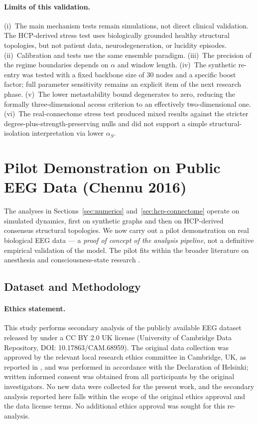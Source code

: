 \documentclass[11pt,a4paper]{article}
\theoremstyle{plain}
\theoremstyle{definition}
\theoremstyle{remark}
\begin{document}
\paragraph{Limits of this validation.} (i)~The main mechanism tests remain simulations, not direct clinical validation. The HCP-derived stress test uses biologically grounded healthy structural topologies, but not patient data, neurodegeneration, or lucidity episodes. (ii)~Calibration and tests use the same ensemble paradigm. (iii)~The precision of the regime boundaries depends on $\alpha$ and window length. (iv)~The synthetic re-entry was tested with a fixed backbone size of 30 nodes and a specific boost factor; full parameter sensitivity remains an explicit item of the next research phase. (v)~The lower metastability bound degenerates to zero, reducing the formally three-dimensional access criterion to an effectively two-dimensional one. (vi)~The real-connectome stress test produced mixed results against the stricter degree-plus-strength-preserving nulls and did not support a simple structural-isolation interpretation via lower $\alpha_S$.


\section{Pilot Demonstration on Public EEG Data (Chennu 2016)}
\label{sec:pilot}

The analyses in Sections~\ref{sec:numerics} and~\ref{sec:hcp-connectome} operate on simulated dynamics, first on synthetic graphs and then on HCP-derived consensus structural topologies. We now carry out a pilot demonstration on real biological EEG data --- a \emph{proof of concept of the analysis pipeline}, not a definitive empirical validation of the model. The pilot fits within the broader literature on anesthesia and consciousness-state research \citep{alkire2008,sarasso2015,bola2017}.

\subsection{Dataset and Methodology}

\paragraph{Ethics statement.} This study performs secondary analysis of the publicly available EEG dataset released by \citet{chennu2016} under a CC BY 2.0 UK license (University of Cambridge Data Repository, DOI: 10.17863/CAM.68959). The original data collection was approved by the relevant local research ethics committee in Cambridge, UK, as reported in \citet{chennu2016}, and was performed in accordance with the Declaration of Helsinki; written informed consent was obtained from all participants by the original investigators. No new data were collected for the present work, and the secondary analysis reported here falls within the scope of the original ethics approval and the data license terms. No additional ethics approval was sought for this re-analysis.
\end{document}
